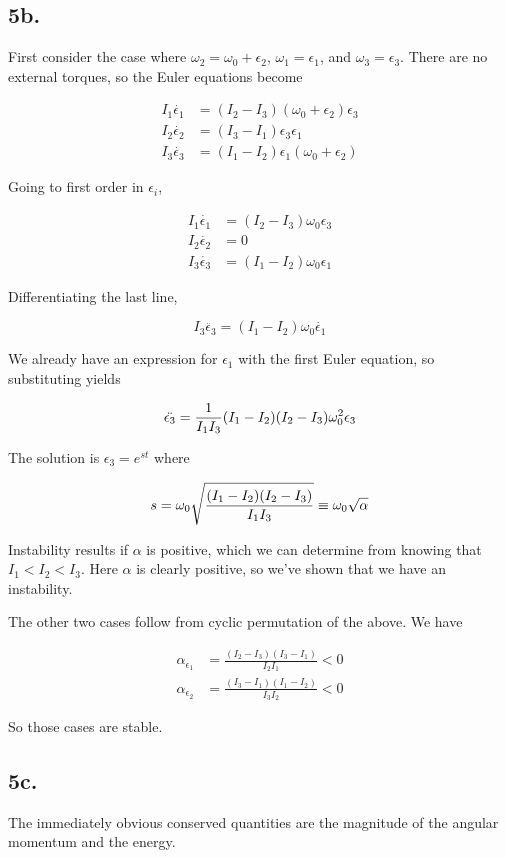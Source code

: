 \documentclass[12pt]{article}
\begin{document}
\subsection*{5b.}

First consider the case where \(\omega_2 = \omega_0 + \epsilon_2\), \(\omega_1 = \epsilon_1\), and \(\omega_3 = \epsilon_3\). There are no external torques, so the Euler equations become

\begin{align*}
I_1\dot{\epsilon_1} &= (I_2-I_3)(\omega_0+\epsilon_2) \epsilon_3 \\
I_2\dot{\epsilon_2} &= (I_3-I_1)\epsilon_3 \epsilon_1 \\
I_3\dot{\epsilon_3} &= (I_1-I_2)\epsilon_1 (\omega_0 + \epsilon_2) 
\end{align*}

Going to first order in \(\epsilon_i\),

\begin{align*}
I_1\dot{\epsilon_1} &= (I_2-I_3)\omega_0 \epsilon_3 \\
I_2\dot{\epsilon_2} &= 0 \\
I_3\dot{\epsilon_3} &= (I_1-I_2)\omega_0 \epsilon_1
\end{align*}

Differentiating the last line,

\[ I_3 \ddot{\epsilon_3} = (I_1-I_2)\omega_0 \dot{\epsilon_1}
\]

We already have an expression for \(\epsilon_1\) with the first Euler equation, so substituting yields

\[ \ddot{\epsilon_3} = \frac{1}{I_1I_3}(I_1-I_2)(I_2-I_3)\omega_0^2 \epsilon_3
\]

The solution is \( \epsilon_3 = e^{st} \) where

\[ s = \omega_0 \sqrt{\frac{(I_1-I_2)(I_2-I_3)}{I_1I_3}} \equiv \omega_0\sqrt{\alpha}
\]

Instability results if \(\alpha\) is positive, which we can determine from knowing that \(I_1<I_2<I_3\). Here \(\alpha\) is clearly positive, so we've shown that we have an instability.

The other two cases follow from cyclic permutation of the above. We have

\begin{align*}
\alpha_{\epsilon_1} &= \frac{(I_2-I_3)(I_3-I_1)}{I_2I_1} < 0\\
\alpha_{\epsilon_2} &= \frac{(I_3-I_1)(I_1-I_2)}{I_3I_2} < 0
\end{align*}

So those cases are stable.

\subsection*{5c.}

The immediately obvious conserved quantities are the magnitude of the angular momentum and the energy.
\end{document}
